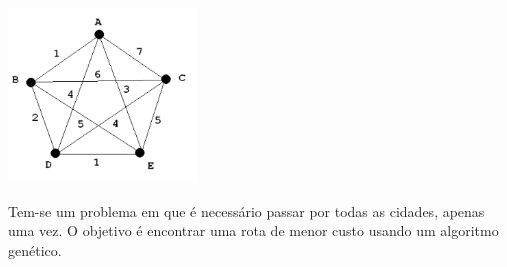 \documentclass[12pt,a4paper,oneside]{article}
\begin{document}
\begin{enumerate}
	\begin{center}
		\includegraphics[width=5cm]{images/fig02.png}
	\end{center}
	
	Tem-se um problema em que é necessário passar por todas as cidades, apenas uma vez. O objetivo é encontrar uma rota de menor custo usando um algoritmo genético.
	

\end{enumerate}
\end{document}
